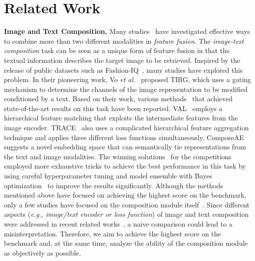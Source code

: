 \documentclass[10pt,twocolumn,letterpaper]{article}
\begin{document}
\section{Related Work}
\noindent
\textbf{Image and Text Composition.}
Many studies~\cite{ben2019block,ben2017mutan,kim2016hadamard,yu2017multi,yu2018beyond,fukui2016multimodal} have investigated effective ways to combine more than two different modalities in \textit{feature fusion}. The \textit{image-text composition} task can be seen as a unique form of feature fusion in that the textual information describes the target image to be retrieved. Inspired by the release of public datasets such as Fashion-IQ~\cite{guo2019fashion}, many studies have explored this problem. In their pioneering work, Vo \textit{et al.}~\cite{vo2019composing} proposed TIRG, which uses a gating mechanism to determine the channels of the image representation to be modified conditioned by a text. Based on their work, various methods~\cite{anwaar2020compositional,vo2019composing,shin2020fashion,chen2020image,chen2020learning,jandial2020trace} that achieved state-of-the-art results on this task have been reported. VAL~\cite{chen2020image} employs a hierarchical feature matching that exploits the intermediate features from the image encoder. TRACE~\cite{jandial2020trace} also uses a complicated hierarchical feature aggregation technique and applies three different loss functions simultaneously. ComposeAE\cite{vo2019composing} suggests a novel embedding space that can semantically tie representations from the text and image modalities.
The winning solutions~\cite{shin2020fashion,kim2021cycled} for the competitions employed more exhaustive tricks to achieve the best performance in this task by using careful hyperparameter tuning and model ensemble with Bayes optimization~\cite{snoek2012practical} to improve the results significantly.
Although the methods mentioned above have focused on achieving the highest score on the benchmark, only a few studies have focused on the composition module itself~\cite{vo2019composing,anwaar2020compositional}. Since different aspects (\textit{e.g., image/text encoder or loss function}) of image and text composition were addressed in recent related works~\cite{anwaar2020compositional,shin2020fashion,chen2020image,chen2020learning,jandial2020trace}, a naive comparison could lead to a misinterpretation. Therefore, we aim to achieve the highest score on the benchmark and, at the same time, analyze the ability of the composition module as objectively as possible.
\end{document}
